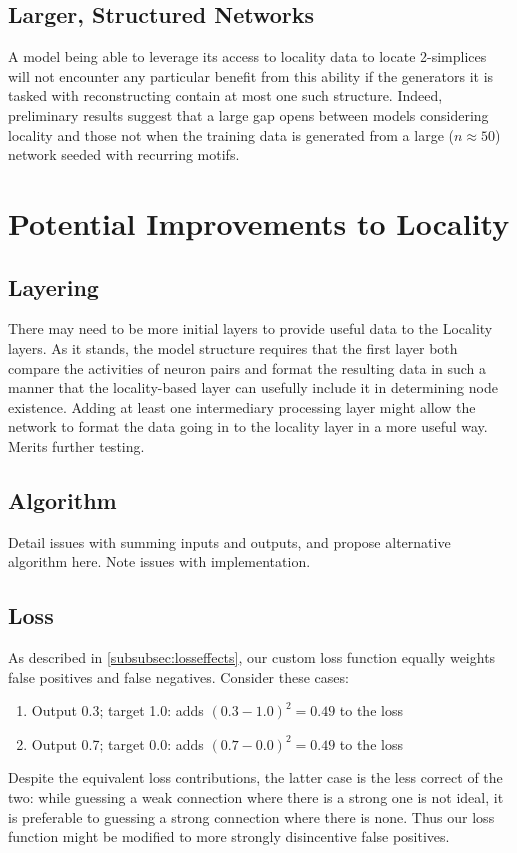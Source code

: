 \subsection{Larger, Structured Networks}
A model being able to leverage its access to locality data to locate 2-simplices 
will not encounter any particular benefit from this ability if the generators it 
is tasked with reconstructing contain at most one such structure. Indeed, 
preliminary results suggest that a large gap opens between models considering 
locality and those not when the training data is generated from a large 
($n\approx50$) network seeded with recurring motifs.

\section{Potential Improvements to Locality}

\subsection{Layering}
There may need to be more initial layers to provide useful data to the Locality 
layers.  As it stands, the model structure requires that the first layer both 
compare the activities of neuron pairs and format the resulting data in such a 
manner that the locality-based layer can usefully include it in determining node 
existence.  Adding at least one intermediary processing layer might allow the 
network to format the data going in to the locality layer in a more useful way.  
Merits further testing.

\subsection{Algorithm}
Detail issues with summing inputs and outputs, and propose alternative algorithm 
here. Note issues with implementation.

\subsection{Loss}
\label{subsec:lossdisc}
As described in \ref{subsubsec:losseffects}, our custom loss function equally 
weights false positives and false negatives. Consider these cases:

\begin{enumerate}
	\item Output 0.3; target 1.0: adds $(0.3-1.0)^2=0.49$ to the loss
	\item Output 0.7; target 0.0: adds $(0.7-0.0)^2=0.49$ to the loss
\end{enumerate}
Despite the equivalent loss contributions, the latter case is the less correct 
of the two: while guessing a weak connection where there is a strong one is not 
ideal, it is preferable to guessing a strong connection where there is none.  
Thus our loss function might be modified to more strongly disincentive false 
positives.


